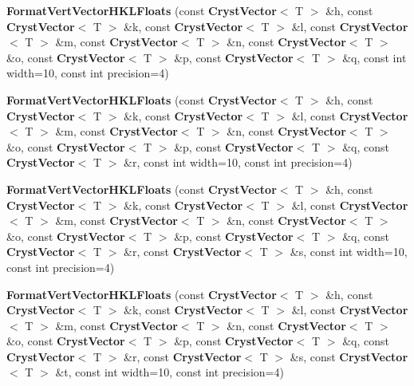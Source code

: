 \begin{DoxyCompactItemize}
\item 
{\bfseries \-Format\-Vert\-Vector\-H\-K\-L\-Floats} (const {\bf \-Cryst\-Vector}$<$ \-T $>$ \&h, const {\bf \-Cryst\-Vector}$<$ \-T $>$ \&k, const {\bf \-Cryst\-Vector}$<$ \-T $>$ \&l, const {\bf \-Cryst\-Vector}$<$ \-T $>$ \&m, const {\bf \-Cryst\-Vector}$<$ \-T $>$ \&n, const {\bf \-Cryst\-Vector}$<$ \-T $>$ \&o, const {\bf \-Cryst\-Vector}$<$ \-T $>$ \&p, const {\bf \-Cryst\-Vector}$<$ \-T $>$ \&q, const int width=10, const int precision=4)\label{a00033_acb9f12201a79cd8e7007a9d25da07ff4}

\item 
{\bfseries \-Format\-Vert\-Vector\-H\-K\-L\-Floats} (const {\bf \-Cryst\-Vector}$<$ \-T $>$ \&h, const {\bf \-Cryst\-Vector}$<$ \-T $>$ \&k, const {\bf \-Cryst\-Vector}$<$ \-T $>$ \&l, const {\bf \-Cryst\-Vector}$<$ \-T $>$ \&m, const {\bf \-Cryst\-Vector}$<$ \-T $>$ \&n, const {\bf \-Cryst\-Vector}$<$ \-T $>$ \&o, const {\bf \-Cryst\-Vector}$<$ \-T $>$ \&p, const {\bf \-Cryst\-Vector}$<$ \-T $>$ \&q, const {\bf \-Cryst\-Vector}$<$ \-T $>$ \&r, const int width=10, const int precision=4)\label{a00033_a8d5ee53cb53c61b1909657e1e696b86b}

\item 
{\bfseries \-Format\-Vert\-Vector\-H\-K\-L\-Floats} (const {\bf \-Cryst\-Vector}$<$ \-T $>$ \&h, const {\bf \-Cryst\-Vector}$<$ \-T $>$ \&k, const {\bf \-Cryst\-Vector}$<$ \-T $>$ \&l, const {\bf \-Cryst\-Vector}$<$ \-T $>$ \&m, const {\bf \-Cryst\-Vector}$<$ \-T $>$ \&n, const {\bf \-Cryst\-Vector}$<$ \-T $>$ \&o, const {\bf \-Cryst\-Vector}$<$ \-T $>$ \&p, const {\bf \-Cryst\-Vector}$<$ \-T $>$ \&q, const {\bf \-Cryst\-Vector}$<$ \-T $>$ \&r, const {\bf \-Cryst\-Vector}$<$ \-T $>$ \&s, const int width=10, const int precision=4)\label{a00033_a7db9be5bdbb73648664b87151e736ecd}

\item 
{\bfseries \-Format\-Vert\-Vector\-H\-K\-L\-Floats} (const {\bf \-Cryst\-Vector}$<$ \-T $>$ \&h, const {\bf \-Cryst\-Vector}$<$ \-T $>$ \&k, const {\bf \-Cryst\-Vector}$<$ \-T $>$ \&l, const {\bf \-Cryst\-Vector}$<$ \-T $>$ \&m, const {\bf \-Cryst\-Vector}$<$ \-T $>$ \&n, const {\bf \-Cryst\-Vector}$<$ \-T $>$ \&o, const {\bf \-Cryst\-Vector}$<$ \-T $>$ \&p, const {\bf \-Cryst\-Vector}$<$ \-T $>$ \&q, const {\bf \-Cryst\-Vector}$<$ \-T $>$ \&r, const {\bf \-Cryst\-Vector}$<$ \-T $>$ \&s, const {\bf \-Cryst\-Vector}$<$ \-T $>$ \&t, const int width=10, const int precision=4)\label{a00033_a4447e13944800430f8dfd62561620ddf}


\end{DoxyCompactItemize}
